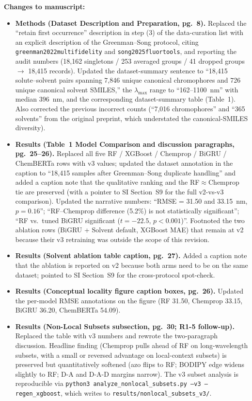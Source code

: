\documentclass[11pt]{article}
\newenvironment{changes}{%
  \noindent\textbf{Changes to manuscript:}
  \begin{itemize}[leftmargin=2em,itemsep=2pt]}{%
  \end{itemize}\medskip}
\begin{document}
\begin{changes}
  \item \textbf{Methods (Dataset Description and Preparation, pg.\ 8).} Replaced the ``retain first occurrence'' description in step (3) of the data-curation list with an explicit description of the Greenman--Song protocol, citing \texttt{greenman2022multifidelity} and \texttt{song2025fluortools}, and reporting the audit numbers (18{,}162 singletons / 253 averaged groups / 41 dropped groups $\to$ 18{,}415 records). Updated the dataset-summary sentence to ``18{,}415 solute--solvent pairs spanning 7{,}846 unique canonical chromophores and 726 unique canonical solvent SMILES,'' the $\lambda_{\max}$ range to ``162--1100~nm'' with median $396$~nm, and the corresponding dataset-summary table (Table~1). Also corrected the previous incorrect counts (``7{,}016 chromophores'' and ``365 solvents'' from the original preprint, which understated the canonical-SMILES diversity).
  \item \textbf{Results (Table~1 Model Comparison and discussion paragraphs, pg.\ 25--26).} Replaced all five RF / XGBoost / Chemprop / BiGRU / ChemBERTa rows with v3 values; updated the dataset annotation in the caption to ``18,415 samples after Greenman--Song duplicate handling'' and added a caption note that the qualitative ranking and the RF$\approx$Chemprop tie are preserved (with a pointer to SI Section~S9 for the full v2-vs-v3 comparison). Updated the narrative numbers: ``RMSE = 31.50 and 33.15~nm, $p = 0.16$''; ``RF--Chemprop difference (5.2\%) is not statistically significant''; ``RF vs.\ tuned BiGRU significant ($t = -22.5$, $p < 0.001$)''. Footnoted the two ablation rows (BiGRU + Solvent default, XGBoost MAE) that remain at v2 because their v3 retraining was outside the scope of this revision.
  \item \textbf{Results (Solvent ablation table caption, pg.\ 27).} Added a caption note that the ablation is reported on v2 because both arms need to be on the same dataset; pointed to SI Section~S9 for the cross-protocol spot-check.
  \item \textbf{Results (Conceptual locality figure caption boxes, pg.\ 26).} Updated the per-model RMSE annotations on the figure (RF 31.50, Chemprop 33.15, BiGRU 36.20, ChemBERTa 54.09).
 \item \textbf{Results (Non-Local Subsets subsection, pg.\ 30; R1-5 follow-up).} Replaced the table with v3 numbers and rewrote the two-paragraph discussion. Headline finding (Chemprop pulls ahead of RF on long-wavelength subsets, with a small or reversed advantage on local-context subsets) is preserved but quantitatively softened (azo flips to RF; BODIPY edge widens slightly to RF; D-A and D-A-D margins narrow). The v3 subset analysis is reproducible via \texttt{python3 analyze\_nonlocal\_subsets.py --v3 --regen\_xgboost}, which writes to \texttt{results/nonlocal\_subsets\_v3/}.

\end{changes}
\end{document}
